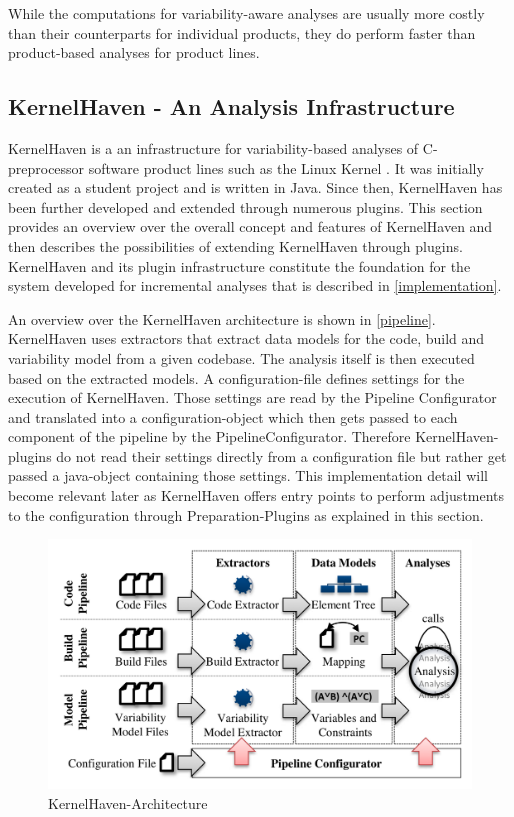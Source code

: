 \documentclass[a4paper]{article}
\begin{document}
While the computations for variability-aware analyses are usually more costly than their counterparts for individual products, they do perform faster than product-based analyses for product lines.

\subsection{KernelHaven - An Analysis Infrastructure}\label{kernelhaven}

KernelHaven is a an infrastructure for variability-based analyses of C-preprocessor software product lines such as the Linux Kernel \cite{KroeherEl-SharkawySchmid18}. It was initially created as a student project and is written in Java.  Since then, KernelHaven has been further developed and extended through numerous plugins. This section  provides an overview over the overall concept and features of KernelHaven and then describes the possibilities of extending KernelHaven through plugins. KernelHaven and its plugin infrastructure constitute the foundation for the system developed for incremental analyses that is described in \autoref{implementation}. 

An overview over the KernelHaven architecture is shown in \autoref{pipeline}. KernelHaven uses extractors that extract data models for the code, build and variability model from a given codebase. The analysis itself is then executed based on the extracted models. A configuration-file defines settings for the execution of KernelHaven. Those settings are read by the Pipeline Configurator and translated into a configuration-object which then gets passed to each component of the pipeline by the PipelineConfigurator. Therefore KernelHaven-plugins do not read their settings directly from a configuration file but rather get passed a java-object containing those settings. This implementation detail will become relevant later as KernelHaven offers entry points to perform adjustments to the configuration through Preparation-Plugins as explained in this section.

\begin{figure}[h] 
  \centering
  \begin{minipage}[b]{1\textwidth} 
    \caption[KernelHaven-Pipeline]{KernelHaven-Architecture \cite{KroeherEl-SharkawySchmid18}}\label{pipeline}
    \includegraphics[width=1\textwidth]{img/KernelHaven-Pipeline.png}
  \end{minipage}
\end{figure}
\end{document}
